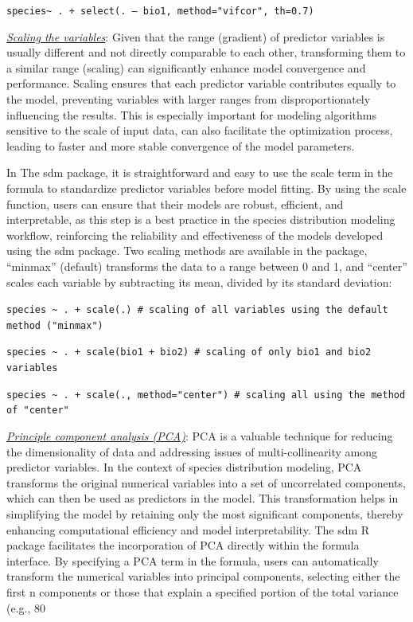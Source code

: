 \documentclass[
]{article}
\begin{document}
\begin{mdframed}[backgroundcolor=gray!10, linecolor=black!75, linewidth=2pt, roundcorner=5pt, shadow=true,frametitle={\textbf{BOX 1: \uline{Formula interface in the sdmData function}}}]
\texttt{species\textasciitilde{} . + select(. – bio1, method="vifcor", th=0.7) }

\uline{\textit{Scaling the variables}}: Given that the range (gradient) of predictor variables is usually different and not directly comparable to each other, transforming them to a similar range (scaling) can significantly enhance model convergence and performance. Scaling ensures that each predictor variable contributes equally to the model, preventing variables with larger ranges from disproportionately influencing the results. This is especially important for modeling algorithms sensitive to the scale of input data, can also facilitate the optimization process, leading to faster and more stable convergence of the model parameters. 

In The sdm package, it is straightforward and easy to use the scale term in the formula to standardize predictor variables before model fitting. By using the scale function, users can ensure that their models are robust, efficient, and interpretable, as this step is a best practice in the species distribution modeling workflow, reinforcing the reliability and effectiveness of the models developed using the sdm package. Two scaling methods are available in the package, “minmax” (default) transforms the data to a range between 0 and 1, and “center” scales each variable by subtracting its mean, divided by its standard deviation:

\texttt{species \textasciitilde{} . + scale(.) \# scaling of all variables using the default method ("minmax") }

\texttt{species \textasciitilde{} . + scale(bio1 + bio2) \# scaling of only bio1 and bio2 variables}

\texttt{species \textasciitilde{} . + scale(., method="center") \# scaling all using the method of "center"}
 
\uline{\textit{Principle component analysis (PCA)}}: PCA is a valuable technique for reducing the dimensionality of data and addressing issues of multi-collinearity among predictor variables. In the context of species distribution modeling, PCA transforms the original numerical variables into a set of uncorrelated components, which can then be used as predictors in the model. This transformation helps in simplifying the model by retaining only the most significant components, thereby enhancing computational efficiency and model interpretability. The sdm R package facilitates the incorporation of PCA directly within the formula interface. By specifying a PCA term in the formula, users can automatically transform the numerical variables into principal components, selecting either the first n components or those that explain a specified portion of the total variance (e.g., 80%


\end{mdframed}
\end{document}
